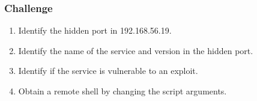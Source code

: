 \documentclass[aspectratio=169,xcolor=dvipsnames]{beamer}
\begin{document}
\begin{frame}
    \frametitle{Challenge}

    \begin{enumerate}
        \item Identify the hidden port in 192.168.56.19.
        \item Identify the name of the service and version in the hidden port.
        \item Identify if the service is vulnerable to an exploit.
        \item Obtain a remote shell by changing the script arguments.
    \end{enumerate}

\end{frame}
\end{document}
